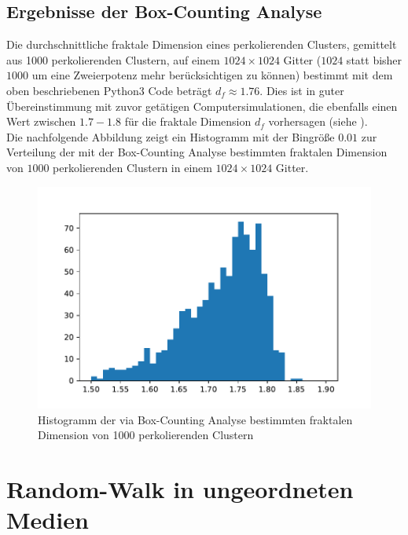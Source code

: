 \documentclass[a4paper, 12pt]{report}
\begin{document}
\newpage

\subsection{Ergebnisse der Box-Counting Analyse}
Die durchschnittliche fraktale Dimension eines perkolierenden Clusters, gemittelt aus 1000 perkolierenden Clustern, auf einem $1024\times 1024$ Gitter ($1024$ statt bisher $1000$ um eine Zweierpotenz mehr berücksichtigen zu können) bestimmt mit dem oben beschriebenen Python3 Code beträgt $d_f\approx 1.76$. Dies ist in guter Übereinstimmung mit zuvor getätigen Computersimulationen, die ebenfalls einen Wert zwischen $1.7 - 1.8$ für die fraktale Dimension $d_f$ vorhersagen (siehe \cite{Voss_1984}).
\\
\noindent Die nachfolgende Abbildung zeigt ein Histogramm mit der Bingröße $0.01$ zur Verteilung der mit der Box-Counting Analyse bestimmten fraktalen Dimension von $1000$ perkolierenden Clustern in einem $1024\times 1024$ Gitter.

\begin{figure}[H]
	\centering
	\includegraphics[scale=0.85]{fractal_histo.pdf}
	\caption{Histogramm der via Box-Counting Analyse bestimmten fraktalen Dimension von 1000 perkolierenden Clustern}
\end{figure}

\section{Random-Walk in ungeordneten Medien}
\end{document}
